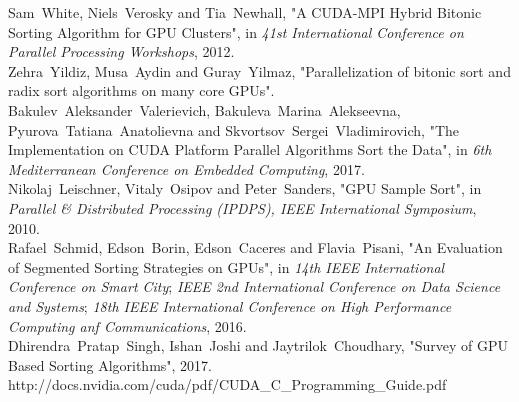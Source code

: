 \documentclass[conference]{IEEEtran}
\begin{document}
\begin{thebibliography}{1}

Sam~White, Niels~Verosky and Tia~Newhall, "A CUDA-MPI Hybrid Bitonic Sorting Algorithm for GPU Clusters", in \emph{41st International Conference on Parallel Processing Workshops}, 2012.
\\
Zehra~Yildiz, Musa~Aydin and Guray~Yilmaz, "Parallelization of bitonic sort and radix sort algorithms on many core GPUs".
\\
Bakulev~Aleksander~Valerievich, Bakuleva~Marina~Alekseevna, Pyurova~Tatiana~Anatolievna and Skvortsov~Sergei~Vladimirovich, "The Implementation on CUDA Platform Parallel
Algorithms Sort the Data", in \emph{6th Mediterranean Conference on Embedded Computing}, 2017.
\\
Nikolaj~Leischner, Vitaly~Osipov and Peter~Sanders, "GPU Sample Sort", in \emph{Parallel \& Distributed Processing (IPDPS), IEEE
International Symposium}, 2010.
\\
Rafael~Schmid, Edson~Borin, Edson~Caceres and Flavia~Pisani, "An Evaluation of Segmented Sorting Strategies on GPUs", in \emph{14th IEEE International Conference on Smart City}; \emph{IEEE 2nd International Conference on Data Science and Systems}; \emph{18th IEEE International Conference on High Performance Computing anf Communications}, 2016.
\\
Dhirendra~Pratap~Singh, Ishan~Joshi and Jaytrilok~Choudhary, "Survey of GPU Based Sorting Algorithms", 2017.
\\
http://docs.nvidia.com/cuda/pdf/CUDA\_C\_Programming\_Guide.pdf

\end{thebibliography}
\end{document}
